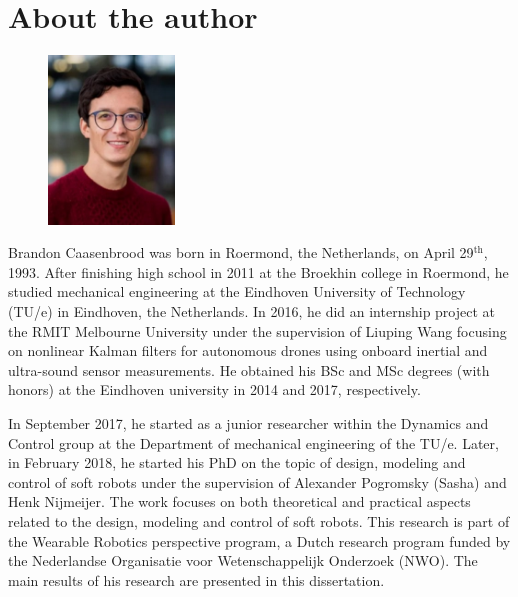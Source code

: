 \chapter*{About the author}

\begin{figure}
\centering
\vspace{-4mm}
\includegraphics[width=0.3\textwidth]{./fig/Brandon.jpg}
\vspace{-9mm}
\end{figure}
Brandon Caasenbrood was born in Roermond, the Netherlands, on April 29$^{\textrm{th}}$, 1993. After finishing high school in 2011 at the Broekhin college in Roermond, he studied mechanical engineering at the Eindhoven University of Technology (TU/e) in Eindhoven, the Netherlands. In 2016, he did an internship project at the RMIT Melbourne University under the supervision of Liuping Wang focusing on nonlinear Kalman filters for autonomous drones using onboard inertial and ultra-sound sensor measurements. He obtained his BSc and MSc degrees (with honors) at the Eindhoven university in 2014 and 2017, respectively. 

In September 2017, he started as a junior researcher within the Dynamics and Control group at the Department of mechanical engineering of the TU/e. Later, in February 2018, he started his PhD on the topic of design, modeling and control of soft robots under the supervision of Alexander Pogromsky (Sasha) and Henk Nijmeijer. The work focuses on both theoretical and practical aspects related to the design, modeling and control of soft robots. This research is part of the Wearable Robotics perspective program, a Dutch research program funded by the Nederlandse Organisatie voor Wetenschappelijk Onderzoek (NWO). The main results of his research are presented in this dissertation.
